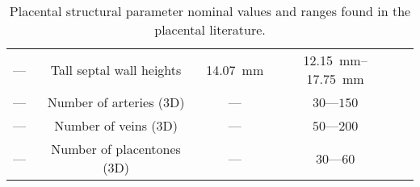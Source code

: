 \begin{table}
\begin{adjustwidth}{-1.5cm}{-1cm}
\begin{tabular}{c|c|c|c|c}
                        — & Tall septal wall heights & \qty{14.07}{\milli\metre} & \qtyrange{12.15}{17.75}{\milli\metre} & \cite{AMANITIS2023e68} \\
                        — & Number of arteries (3D) & — & $30$—$150$ & \cite{benirschkePathologyHumanPlacenta2012,chernyavskyMathematicalModelIntervillous2010,burtonRheologicalPhysiologicalConsequences2009} \\
                        — & Number of veins (3D) & — & $50$—$200$ & \cite{chernyavskyMathematicalModelIntervillous2010} \\
                        — & Number of placentones (3D) & — & $30$—$60$ & \cite{benirschkePathologyHumanPlacenta2012,serovRoleMorphologyMathematical2016} \\
                    \end{tabular}
                \end{adjustwidth}
                \caption{Placental structural parameter nominal values and ranges found in the placental literature.}
                \label{tab:structural-parameters}
            \end{table}

